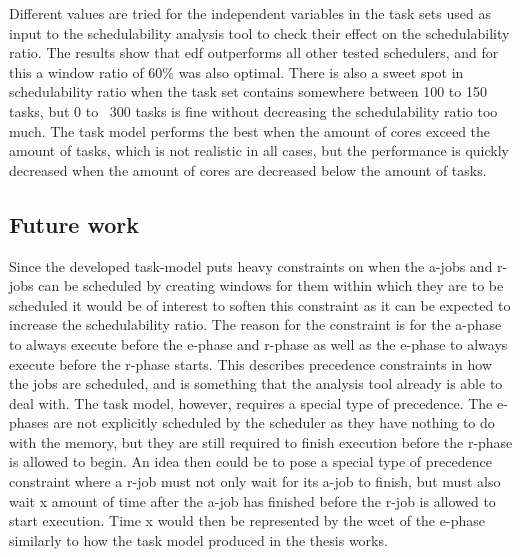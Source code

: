 \documentclass{kththesis}
\begin{document}
Different values are tried for the independent variables in the task sets used as input to the
schedulability analysis tool to check their effect on the schedulability ratio. The results show
that \acrshort{edf} outperforms all other tested schedulers, and for this a window ratio of 60\% was
also optimal. There is also a sweet spot in schedulability ratio when the task set contains
somewhere between 100 to 150 tasks, but 0 to ~300 tasks is fine without decreasing the
schedulability ratio too much. The task model performs the best when the amount of cores exceed the
amount of tasks, which is not realistic in all cases, but the performance is quickly decreased when
the amount of cores are decreased below the amount of tasks.







\subsection{Future work}\label{sec:future_work}

Since the developed task-model puts heavy constraints on when the \acrshort{a}-jobs and
\acrshort{r}-jobs can be scheduled by creating windows for them within which they are to be
scheduled it would be of interest to soften this constraint as it can be expected to increase the
schedulability ratio. The reason for the constraint is for the \acrshort{a}-phase to always execute
before the \acrshort{e}-phase and \acrshort{r}-phase as well as the \acrshort{e}-phase to always
execute before the \acrshort{r}-phase starts. This describes precedence constraints in how the jobs
are scheduled, and is something that the analysis tool already is able to deal with. The task model,
however, requires a special type of precedence. The \acrshort{e}-phases are not explicitly scheduled
by the scheduler as they have nothing to do with the memory, but they are still required to finish
execution before the \acrshort{r}-phase is allowed to begin. An idea then could be to pose a special
type of precedence constraint where a \acrshort{r}-job must not only wait for its \acrshort{a}-job
to finish, but must also wait x amount of time after the \acrshort{a}-job has finished before the
\acrshort{r}-job is allowed to start execution. Time x would then be represented by the
\acrshort{wcet} of the \acrshort{e}-phase similarly to how the task model produced in the thesis
works. 
\end{document}
